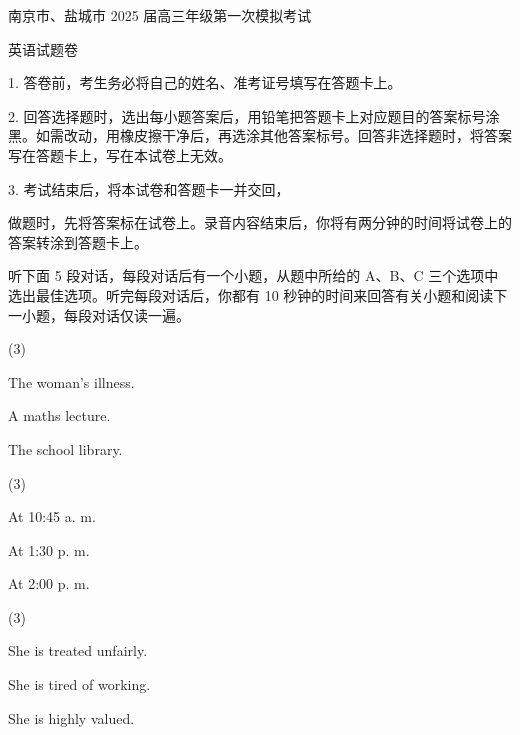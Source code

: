 \documentclass{英语试卷}
\begin{document}
\par 南京市、盐城市 2025 届高三年级第一次模拟考试\par
\par 英语试题卷\par
\begin{notice}
\par 1. 答卷前，考生务必将自己的姓名、准考证号填写在答题卡上。\par
\par 2. 回答选择题时，选出每小题答案后，用铅笔把答题卡上对应题目的答案标号涂黑。如需改动，用橡皮擦干净后，再选涂其他答案标号。回答非选择题时，将答案写在答题卡上，写在本试卷上无效。\par
\par 3. 考试结束后，将本试卷和答题卡一并交回，\par
\end{notice}
\par 做题时，先将答案标在试卷上。录音内容结束后，你将有两分钟的时间将试卷上的答案转涂到答题卡上。\par
{}
\par 听下面 5 段对话，每段对话后有一个小题，从题中所给的 A、B、C 三个选项中选出最佳选项。听完每段对话后，你都有 10 秒钟的时间来回答有关小题和阅读下一小题，每段对话仅读一遍。\par
{}
\begin{choices}(3)
  \item The woman's illness.
  \item A maths lecture.
  \item The school library.
\end{choices}
\begin{choices}(3)
  \item At 10:45 a. m.
  \item At 1:30 p. m.
  \item At 2:00 p. m.
\end{choices}
\begin{choices}(3)
  \item She is treated unfairly.
  \item She is tired of working.
  \item She is highly valued.
\end{choices}
\end{document}
